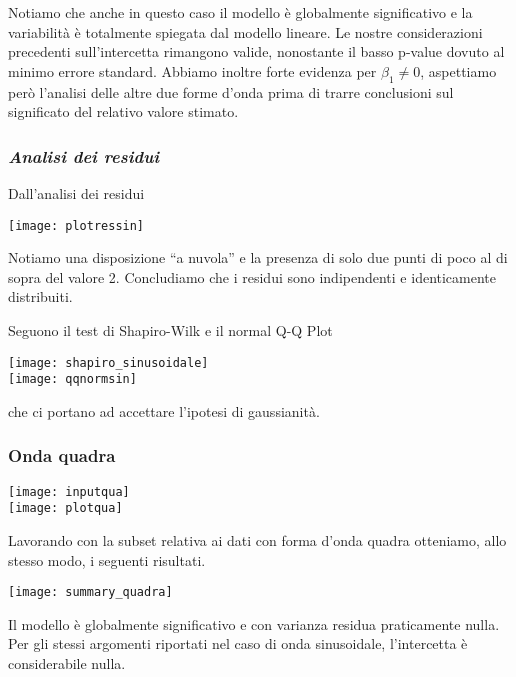 \documentclass[a4paper]{article}
\begin{document}
	Notiamo che anche in questo caso il modello è globalmente significativo e la variabilità è totalmente spiegata dal modello lineare. Le nostre considerazioni precedenti sull’intercetta rimangono valide, nonostante il basso p-value dovuto al minimo errore standard. Abbiamo inoltre forte evidenza per $\beta_1\ne0$, aspettiamo però l’analisi delle altre due forme d’onda prima di trarre conclusioni sul significato del relativo valore stimato.
	
	\subsubsection*{\textit{Analisi dei residui}}
	
	Dall’analisi dei residui
		\begin{center}
		
		\texttt{[image: plotressin]} 
		
	\end{center}
	Notiamo una disposizione “a nuvola” e la presenza di solo due punti di poco al di sopra del valore 2. Concludiamo che i residui sono indipendenti e identicamente distribuiti.
	
	Seguono il test di Shapiro-Wilk e il normal Q-Q Plot 
	\bigskip \\
	\begin{center}
		
		 \texttt{[image: shapiro\_sinusoidale]} 
		\bigskip \\
		
		\texttt{[image: qqnormsin]}
	\end{center}
che ci portano ad accettare l'ipotesi di gaussianità.

	\subsubsection{Onda quadra}
	\bigskip 
	\bigskip 
	\begin{center}
		
		\texttt{[image: inputqua]} 
		\bigskip \\
		\texttt{[image: plotqua]}
	\end{center}
	Lavorando con la subset relativa ai dati con forma d’onda quadra otteniamo, allo stesso modo, i seguenti risultati. 
	\begin{center}
		
		\texttt{[image: summary\_quadra]} 
		
	\end{center}
Il modello è globalmente significativo e con varianza residua praticamente nulla. Per gli stessi argomenti riportati nel caso di onda sinusoidale, l’intercetta è considerabile nulla. 
\end{document}
